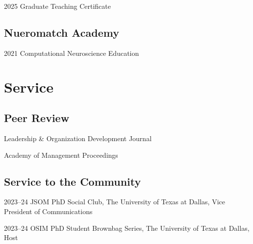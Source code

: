 \documentclass[12pt,letterpaper]{report} %
\newcommand{\listitemspace}{0.2em}
\renewenvironment{itemize}
{\begin{list}{}{\setlength{\leftmargin}{0em}
                \setlength{\parskip}{0em}
                \setlength{\itemsep}{\listitemspace}
                \setlength{\parsep}{\listitemspace}}}
{\end{list}}
\begin{document}
    \begin{tablist}

        \item[2025]\tab{}Graduate Teaching Certificate

    \end{tablist}


    \subsection*{Nueromatch Academy}

    \begin{tablist}
        \item[2021]\tab{}Computational Neuroscience Education
        
    \end{tablist}
    \section*{Service}


    \subsection*{Peer Review}

    \begin{itemize}

        \item Leadership \& Organization Development Journal
        
        \item Academy of Management Proceedings
        
    \end{itemize}


   \subsection*{Service to the Community}

   \begin{tablist}

       \item[2023--24]\tab{}JSOM PhD Social Club, The University of Texas at Dallas, Vice President of Communications
       \item[2023--24]\tab{}OSIM PhD Student Brownbag Series, The University of Texas at Dallas, Host
   \end{tablist}

\end{document}
